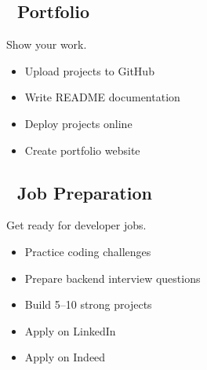 \documentclass{article}
\begin{document}
\subsection*{📂 Portfolio}
Show your work.

\begin{itemize}[label=$\square$]
    \item Upload projects to GitHub
    \item Write README documentation
    \item Deploy projects online
    \item Create portfolio website
\end{itemize}

\subsection*{💼 Job Preparation}
Get ready for developer jobs.

\begin{itemize}[label=$\square$]
    \item Practice coding challenges
    \item Prepare backend interview questions
    \item Build 5–10 strong projects
    \item Apply on LinkedIn
    \item Apply on Indeed
\end{itemize}
\end{document}
